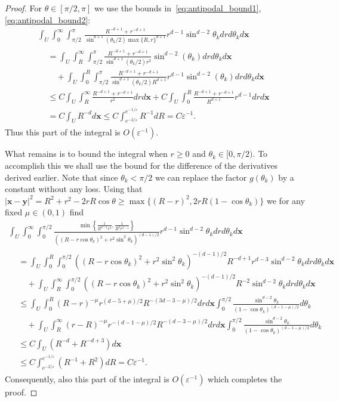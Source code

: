 \documentclass[10pt]{amsart}
\theoremstyle{definition}\newtheorem{defi}[theo]{Definition}\newtheorem{rema}[theo]{Remark}\newtheorem{exam}[theo]{Example}\newtheorem{exem}[theo]{Example}\newtheorem{nota}[theo]{Notation}
\newcommand*\eps{\varepsilon}
\newcommand\1{{\ensuremath {\mathds 1} }}
\newcommand{\bx}{\mathbf{x}}
\newcommand{\by}{\mathbf{y}}
\begin{document}
\begin{proof}
For $\theta \in [\pi/2, \pi]$ we use the bounds in~\eqref{eq:antipodal_bound1}, \eqref{eq:antipodal_bound2}:
\begin{multline*}
\int_U\!\!\int_0^{\infty}\!\!\int_{\pi/2}^\pi\,
\frac{ R^{-d+1}+r^{-d+1}} {\sin^{d+1}(\theta_k/2) \max\{R, r\}^{d+1}} r^{d-1}\sin^{d-2}\theta_k dr d\theta_k d\bx\\
\begin{aligned}
&=
\int_U\int_R^{\infty}\int_{\pi/2}^\pi
\frac{ R^{-d+1}+r^{-d+1}} {\sin^{d+1}(\theta_k/2) r^{2}}\sin^{d-2}(\theta_k) dr d\theta_k d\bx\\
&\quad+
\int_U\int_0^{R}\int_{\pi/2}^\pi
\frac{ R^{-d+1}+r^{-d+1}} {\sin^{d+1}(\theta_k/2) R^{d+1}} r^{d-1}\sin^{d-2}(\theta_k)dr d\theta_k d\bx\\
&\leq C\int_U\int_R^{\infty}
\frac{ R^{-d+1}+r^{-d+1}} {r^{2}} dr d\bx + C\int_U\int_0^{R}
\frac{ R^{-d+1}+r^{-d+1}} {R^{d+1}} r^{d-1}dr d\bx\\
&= C \int_U R^{-d}d\bx
\leq C \int_{e^{-2/\eps}}^{e^{-1/\eps}}R^{-1}dR = C\eps^{-1}.
\end{aligned}
\end{multline*}
Thus this part of the integral is $O(\eps^{-1})$.


What remains is to bound the integral when $r\geq 0$ and $\theta_k\in [0, \pi/2).$ To accomplish this we shall use the bound for the difference of the derivatives derived earlier. Note that since $\theta_k<\pi/2$ we can replace the factor $g(\theta_k)$ by a constant without any loss. Using that $|\bx-\by|^2=R^2+r^2-2r R\cos\theta\geq \max\{(R-r)^2, 2r R(1-\cos\theta_k)\}$ we for any fixed $\mu\in (0, 1)$ find
\begin{multline*}
\int_U\int_{0}^{\infty}\int_0^{\pi/2}
\frac{
\min\left\{
\frac{1}{R^{d-1}r^{2}},
\frac{1}{R^{2}r^{d-1}}
\right\}} {((R-r \cos\theta_k)^2+r^2\sin^2 \theta_k)^{(d-1)/2}} r^{d-1}\sin^{d-2}\theta_k dr d\theta_k d\bx\\
\begin{aligned}
&=
\int_U\!\!\int_{0}^{R}\!\!\int_0^{\pi/2}\!\!\left((R-r \cos\theta_k)^2+r^2\sin^2 \theta_k\right)^{-(d-1)/2} R^{-d+1}r^{d-3}\sin^{d-2}\theta_k dr d\theta_k d\bx\\
&\quad+
\int_U\int_{R}^{\infty}\int_0^{\pi/2} \left((R-r \cos\theta_k)^2+r^2\sin^2 \theta_k\right)^{-(d-1)/2}R^{-2}\sin^{d-2}\theta_k dr d\theta_k d\bx\\
&\leq
\int_U\int_{0}^{R} (R-r)^{-\mu}r^{(d-5+\mu)/2} R^{-(3d-3-\mu)/2} dr d\bx
\int_0^{\pi/2}\frac{\sin^{d-2}\theta_k}{(1-\cos\theta_k)^{(d-1-\mu)/2}}d\theta_k\\
&\quad+
\int_U\int_{R}^{\infty} (r-R)^{-\mu}r^{-(d-1-\mu)/2} R^{-(d-3-\mu)/2} dr d\bx
\int_0^{\pi/2}\frac{\sin^{d-2}\theta_k}{(1-\cos\theta_k)^{(d-1-\mu)/2}}d\theta_k\\
&\leq C\int_U \left(R^{-d}+R^{-d+3}\right) d\bx\\
&\leq C\int_{e^{-2/\eps}}^{e^{-1/\eps}} \left(R^{-1}+R^2\right) dR = C \eps^{-1}.
\end{aligned}
\end{multline*}
Consequently, also this part of the integral is $O(\eps^{-1})$ which completes the proof.
\end{proof}
\end{document}
